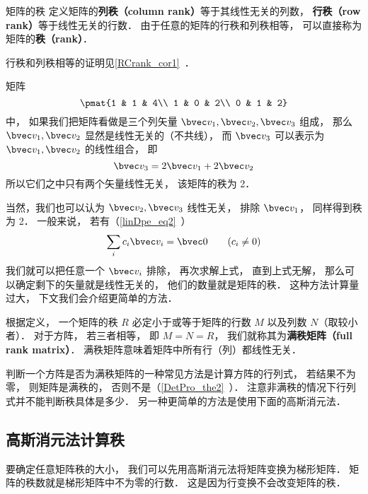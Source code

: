 

\begin{definition}{矩阵的秩}
定义矩阵的\textbf{列秩（column rank）}等于其线性无关的列数， \textbf{行秩（row rank）}等于线性无关的行数． 由于任意的矩阵的行秩和列秩相等， 可以直接称为矩阵的\textbf{秩（rank）}．
\end{definition}
行秩和列秩相等的证明见\autoref{RCrank_cor1}~．

\begin{example}{}
矩阵
\begin{equation}\label{MatRnk_eq1}
\pmat{1 & 1 & 4\\ 1 & 0 & 2\\ 0 & 1 & 2}
\end{equation}
中， 如果我们把矩阵看做是三个列矢量 $\bvec v_1, \bvec v_2, \bvec v_3$ 组成， 那么 $\bvec v_1, \bvec v_2$ 显然是线性无关的（不共线）， 而 $\bvec v_3$ 可以表示为 $\bvec v_1, \bvec v_2$ 的线性组合， 即
\begin{equation}
\bvec v_3 = 2\bvec v_1 + 2\bvec v_2
\end{equation}
所以它们之中只有两个矢量线性无关， 该矩阵的秩为 2．

当然，我们也可以认为 $\bvec v_2, \bvec v_3$ 线性无关， 排除 $\bvec v_1$， 同样得到秩为 2． 一般来说， 若有（\autoref{linDpe_eq2}~）
\begin{equation}
\sum_i c_i \bvec v_i = \bvec 0 \qquad (c_i \ne 0)
\end{equation}
我们就可以把任意一个 $\bvec v_i$ 排除， 再次求解上式， 直到上式无解， 那么可以确定剩下的矢量就是线性无关的， 他们的数量就是矩阵的秩． 这种方法计算量过大， 下文我们会介绍更简单的方法．
\end{example}

根据定义， 一个矩阵的秩 $R$ 必定小于或等于矩阵的行数 $M$ 以及列数 $N$（取较小者）． 对于方阵， 若三者相等， 即 $M = N = R$， 我们就称其为\textbf{满秩矩阵（full rank matrix）}． 满秩矩阵意味着矩阵中所有行（列）都线性无关．

判断一个方阵是否为满秩矩阵的一种常见方法是计算方阵的行列式， 若结果不为零， 则矩阵是满秩的， 否则不是（\autoref{DetPro_the2}~）． 注意非满秩的情况下行列式并不能判断秩具体是多少． 另一种更简单的方法是使用下面的高斯消元法．

\subsection{高斯消元法计算秩}
要确定任意矩阵秩的大小， 我们可以先用高斯消元法将矩阵变换为梯形矩阵． 矩阵的秩数就是梯形矩阵中不为零的行数． 这是因为行变换不会改变矩阵的秩．

